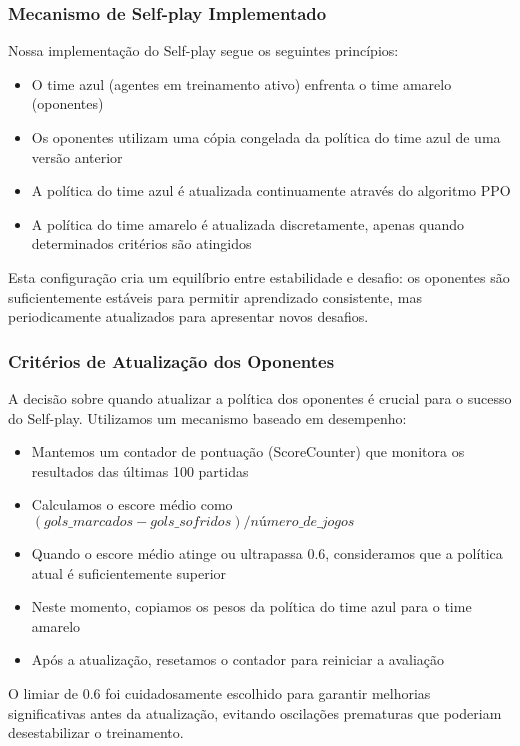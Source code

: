 \subsubsection{Mecanismo de Self-play Implementado}

Nossa implementação do Self-play segue os seguintes princípios:

\begin{itemize}
    \item O time azul (agentes em treinamento ativo) enfrenta o time amarelo (oponentes)
    \item Os oponentes utilizam uma cópia congelada da política do time azul de uma versão anterior
    \item A política do time azul é atualizada continuamente através do algoritmo PPO
    \item A política do time amarelo é atualizada discretamente, apenas quando determinados critérios são atingidos
\end{itemize}

Esta configuração cria um equilíbrio entre estabilidade e desafio: os oponentes são suficientemente estáveis para permitir aprendizado consistente, mas periodicamente atualizados para apresentar novos desafios.

\subsubsection{Critérios de Atualização dos Oponentes}

A decisão sobre quando atualizar a política dos oponentes é crucial para o sucesso do Self-play. Utilizamos um mecanismo baseado em desempenho:

\begin{itemize}
    \item Mantemos um contador de pontuação (ScoreCounter) que monitora os resultados das últimas 100 partidas
    \item Calculamos o escore médio como $(gols\_marcados - gols\_sofridos) / número\_de\_jogos$
    \item Quando o escore médio atinge ou ultrapassa 0.6, consideramos que a política atual é suficientemente superior
    \item Neste momento, copiamos os pesos da política do time azul para o time amarelo
    \item Após a atualização, resetamos o contador para reiniciar a avaliação
\end{itemize}

O limiar de 0.6 foi cuidadosamente escolhido para garantir melhorias significativas antes da atualização, evitando oscilações prematuras que poderiam desestabilizar o treinamento.

